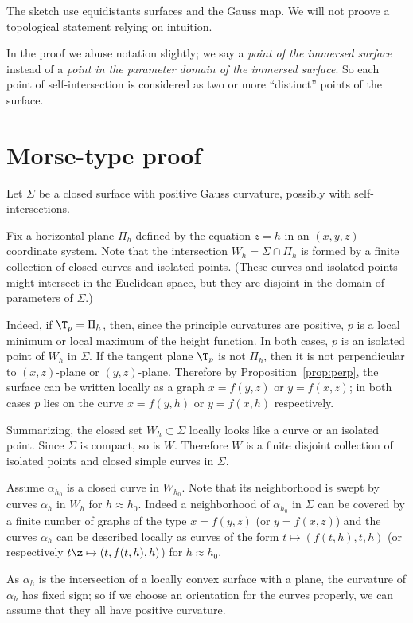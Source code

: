 The sketch use equidistants surfaces and the Gauss map.
We will not proove a topological statement relying on intuition.

In the proof we abuse notation slightly;
we say a {}\emph{point of the immersed surface} instead of a {}\emph{point in the parameter domain of the immersed surface}.
So each point of self-intersection is considered as two or more ``distinct'' points of the surface.

\section*{Morse-type proof}

Let $\Sigma$ be a closed surface with positive Gauss curvature, possibly with self-intersections. 

Fix a horizontal plane $\Pi_h$ defined by the equation $z=h$ in an $(x,y,z)$-coordinate system.
Note that the intersection $W_h=\Sigma\cap\Pi_h$ is formed by a finite collection of closed curves and isolated points.
(These curves and isolated points might intersect in the Euclidean space, but they are disjoint in the domain of parameters of $\Sigma$.)

Indeed, if $\T_p=\Pi_h$, then, since the principle curvatures are positive, $p$ is a local minimum or local maximum of the height function.
In both cases, $p$ is an isolated point of $W_h$ in $\Sigma$.
If the tangent plane $\T_p$ is not $\Pi_h$, then it is not perpendicular to $(x,z)$-plane or $(y,z)$-plane.
Therefore by Proposition~\ref{prop:perp}, the surface can be written locally as a graph $x=f(y,z)$ or $y=f(x,z)$;
in both cases $p$ lies on the curve $x=f(y,h)$ or $y=f(x,h)$ respectively.

Summarizing, the closed set $W_h\subset \Sigma$ locally looks like a curve or an isolated point.
Since $\Sigma$ is compact, so is $W$.
Therefore $W$ is a finite disjoint collection of isolated points and closed simple curves in $\Sigma$.

Assume $\alpha_{h_0}$ is a closed curve in $W_{h_0}$.
Note that its neighborhood is swept by curves $\alpha_h$ in $W_{h}$ for $h\approx h_0$.
Indeed a neighborhood of $\alpha_{h_0}$ in $\Sigma$ can be covered by a finite number of graphs of the type $x=f(y,z)$ (or $y=f(x,z)$) and the curves $\alpha_h$ can be described locally as curves of the form $t\mapsto (f(t,h),t,h)$ (or respectively $t\z\mapsto(t,f(t,h),h)$) for $h\approx h_0$.

As $\alpha_h$ is the intersection of a locally convex surface with a plane,
the curvature of $\alpha_h$ has fixed sign;
so if we choose an orientation for the curves properly, we can assume that they all have positive curvature.


